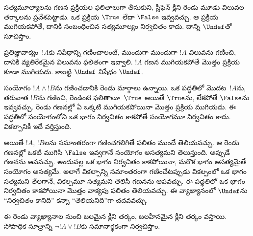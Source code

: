 \documentclass[../../../include/open-logic-section]{subfiles}
\begin{document}


సత్యమూల్యాలను గణన ప్రక్రియల ఫలితాలుగా తీసుకుని,
స్టీఫెన్ క్లీని రెండు మూడు-విలువల తర్కాలను ప్రవేశపెట్టాడు.
ఒక ప్రక్రియ $\True$ లేదా $\False$ ఇవ్వవచ్చు.
ఆ ప్రక్రియ ముగియకపోతే, దానికి సంబంధించిన సత్యమూల్యం
నిర్వచితం కాదు. దాన్ని $\Undef$తో సూచిస్తాం.

ప్రతిజ్ఞావాక్యం~$!A$కు నిషేధాన్ని గణించాలంటే, ముందుగా
ముందుగా $!A$ విలువను గణించి, దానికి వ్యతిరేకమైన విలువను ఫలితంగా ఇవ్వాలి.
$!A$ గణన ముగియకపోతే మొత్తం ప్రక్రియ కూడా ముగియదు.
కాబట్టి $\Undef$ నిషేధం $\Undef$.

సంయోగం $!A \land !B$ను గణించడానికి రెండు
మార్గాలు ఉన్నాయి. ఒక పద్ధతిలో మొదట~$!A$ను, తరువాత $!B$ను
గణించి, రెండింటి ఫలితాలూ~$\True$ అయితే
$\True$ను, లేకపోతే $\False$ను ఇవ్వవచ్చు.
రెండు గణనల్లో ఏ ఒక్కటి ముగియకపోయినా మొత్తం
ప్రక్రియ ముగియదు. ఈ పద్ధతిలో సంయోగంలోని ఒక భాగం
నిర్వచితం కాకపోతే సంయోగమూ నిర్వచితం కాదు.
వికల్పానికీ ఇదే వర్తిస్తుంది.

అయితే $!A$, $!B$లను సమాంతరంగా గణించగలిగితే
ఫలితం ముందే తెలియవచ్చు. ఆ రెండు గణనల్లో ఒకటి ముగిసి
$\False$ ఇవ్వగానే సంయోగం అసత్యమని తెలుస్తుంది.
అప్పుడే గణనను ఆపవచ్చు. అందువల్ల ఒక భాగం
నిర్వచితం కాకపోయినా, మరొక భాగం అసత్యమైతే
సంయోగం అసత్యమే. అలాగే వికల్పాన్ని సమాంతరంగా
గణించేటప్పుడు వికల్పంలో ఒక భాగం సత్యమని తేలగానే,
వికల్పమూ సత్యమని తెలిసి గణనను ఆపవచ్చు. ఈ పద్ధతిలో
ఒక భాగం నిర్వచితం కాకపోయినా మొత్తం వాక్యపు
ఫలితం తెలియవచ్చు. ఈ వ్యాఖ్యానంలో $\Undef$ను
“నిర్వచితం కానిది” కన్నా “తెలియనిది”గా
చదవవచ్చు.

ఈ రెండు వ్యాఖ్యానాల నుంచి బలమైన క్లీని తర్కం,
బలహీనమైన క్లీని తర్కం వస్తాయి. సోపాధిక సూత్రాన్ని
$\lnot !A \lor !B$కు సమానార్థకంగా నిర్వచిస్తాం.
\end{document}
